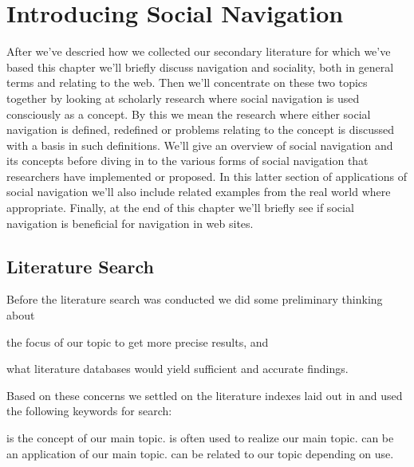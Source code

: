 \chapter{Introducing Social Navigation}
\label{chapter:social.navigation}

After we've descried how we collected our secondary literature for which we've
based this chapter we'll briefly discuss navigation and sociality, both in
general terms and relating to the web. Then we'll concentrate on these two
topics together by looking at scholarly research where social navigation is
used consciously as a concept. By this we mean the research where either
social navigation is defined, redefined or problems relating to the concept is
discussed with a basis in such definitions.
We'll give an overview of social navigation and its concepts before diving in
to the various forms of social navigation that researchers have implemented
or proposed. In this latter section of applications of social navigation we'll
also include related examples from the real world where appropriate.
Finally, at the end of this chapter we'll briefly see if social navigation
is beneficial for navigation in web sites.

\enlargethispage{-\baselineskip}

\section{Literature Search}
\label{section:literature.search}

Before the literature search was conducted we did some preliminary thinking
about
\begin{inparaenum}[(i)]
  \item the focus of our topic to get more precise results, and
  \item what literature databases would yield sufficient and accurate
    findings.
\end{inparaenum}
Based on these concerns we settled on the literature indexes laid out in
 and used the following keywords%
for search:

\begin{items}
   is the concept of our main topic.
   is often used to realize our
    main topic.
   can be an application of our main topic.
   can be related to our topic depending on use.
\end{items}

